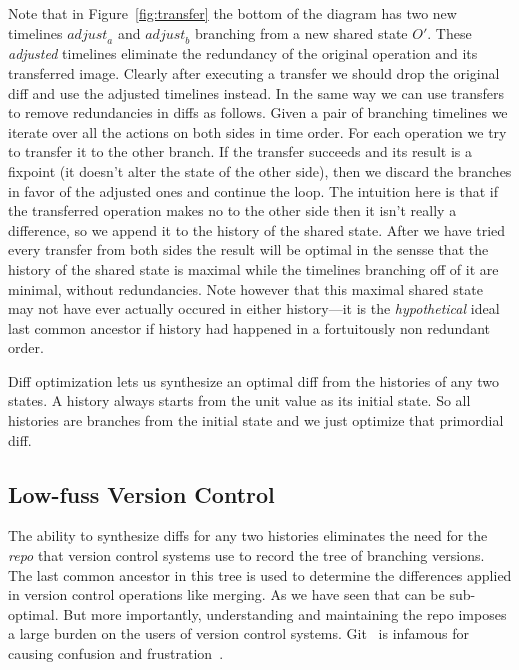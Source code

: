 \documentclass[english,submission]{programming}
\theoremstyle{definition}
\begin{document}
Note that in Figure~\ref{fig:transfer} the bottom of the diagram has two new timelines $\mathit{adjust}_a$ and $\mathit{adjust}_b$ branching from a new shared state $O'$. These \textit{adjusted} timelines eliminate the redundancy of the original operation and its transferred image. Clearly after executing a transfer we should drop the original diff and use the adjusted timelines instead. In the same way we can use transfers to remove redundancies in diffs as follows. Given a pair of branching timelines we iterate over all the actions on both sides in time order. For each operation we try to transfer it to the other branch. If the transfer succeeds and its result is a fixpoint (it doesn't alter the state of the other side), then we discard the branches in favor of the adjusted ones and continue the loop. The intuition here is that if the transferred operation makes no to the other side then it isn't really a difference, so we append it to the history of the shared state. After we have tried every transfer from both sides the result will be optimal in the sensse that the history of the shared state is maximal while the timelines branching off of it are minimal, without redundancies. Note however that this maximal shared state may not have ever actually occured in either history---it is the \textit{hypothetical} ideal last common ancestor if history had happened in a fortuitously non redundant order.

Diff optimization lets us synthesize an optimal diff from the histories of any two states. A history always starts from the unit value as its initial state. So all histories are branches from the initial state and we just optimize that primordial diff.

\subsection{Low-fuss Version Control}

The ability to synthesize diffs for any two histories eliminates the need for the \textit{repo} that version control systems use to record the tree of branching versions. The last common ancestor in this tree is used to determine the differences applied in version control operations like merging. As we have seen that can be sub-optimal. But more importantly, understanding and maintaining the repo imposes a large burden on the users of version control systems. Git~\cite{ProGit} is infamous for causing confusion and frustration~\cite{perez13, church2014case, xkcd1597}.
\end{document}
